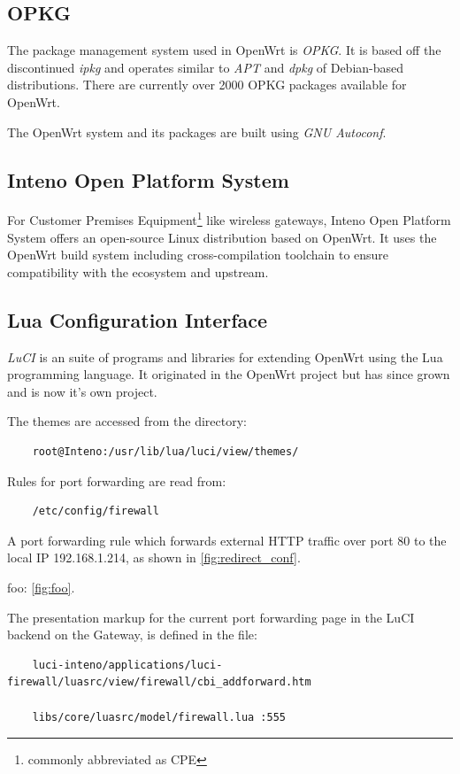 \documentclass[a4paper,11pt]{kth-bcs}
\begin{document}
\subsection{OPKG}
The package management system used in OpenWrt is \emph{OPKG}. It is based off the discontinued \emph{ipkg} and operates similar to \emph{APT} and \emph{dpkg} of Debian-based distributions.
There are currently over 2000 OPKG packages available for OpenWrt.

The OpenWrt system and its packages are built using \emph{GNU Autoconf}.

\subsection{Inteno Open Platform System}
For Customer Premises Equipment\footnote{commonly abbreviated as CPE} like wireless gateways, Inteno Open Platform System offers an open-source Linux distribution based on OpenWrt.
It uses the OpenWrt build system including cross-compilation toolchain to ensure compatibility with the ecosystem and upstream.

\subsection{Lua Configuration Interface}
\emph{LuCI} is an suite of programs and libraries for extending OpenWrt using the Lua programming language.
It originated in the OpenWrt project but has since grown and is now it's own project.

The themes are accessed from the directory:

\begin{verbatim}
    root@Inteno:/usr/lib/lua/luci/view/themes/
\end{verbatim}

Rules for port forwarding are read from:

\begin{verbatim}
    /etc/config/firewall
\end{verbatim}

A port forwarding rule which forwards external HTTP traffic over port 80 to the local IP 192.168.1.214, as shown in \ref{fig:redirect_conf}.

foo: \ref{fig:foo}.


The presentation markup for the current port forwarding page in the LuCI backend on the Gateway, is defined in the file:

\begin{verbatim}
    luci-inteno/applications/luci-firewall/luasrc/view/firewall/cbi_addforward.htm

    libs/core/luasrc/model/firewall.lua :555
\end{verbatim}
\end{document}
